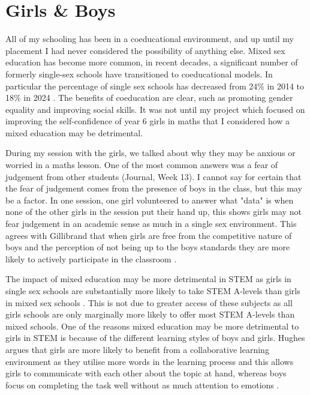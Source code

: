 \documentclass[11pt, a4paper, notitlepage]{article}
\begin{document}
\section*{Girls \& Boys}
All of my schooling has been in a coeducational environment, and up until my placement I had never considered the possibility of anything else. Mixed sex education has become more common, in recent decades, a significant number of formerly single-sex schools have transitioned to coeducational models. In particular the percentage of single sex schools has decreased from 24\% in 2014 to 18\% in 2024 \cite{ICS:2014} \cite{ICS:2024}. The benefits of coeducation are clear, such as promoting gender equality and improving social skills. It was not until my project which focused on improving the self-confidence of year 6 girls in maths that I considered how a mixed education may be detrimental.
\par
During my session with the girls, we talked about why they may be anxious or worried in a maths lesson. One of the most common answers was a fear of judgement from other students (Journal, Week 13). I cannot say for certain that the fear of judgement comes from the presence of boys in the class, but this may be a factor. In one session, one girl volunteered to answer what "data" is when none of the other girls in the session put their hand up, this shows girls may not fear judgement in an academic sense as much in a single sex environment. This agrees with Gillibrand that when girls are free from the competitive nature of boys and the perception of not being up to the boys standards they are more likely to actively participate in the classroom \cite{Gillibrand:1999}.
\par
The impact of mixed education may be more detrimental in STEM as girls in single sex schools are substantially more likely to take STEM A-levels than girls in mixed sex schools \cite{Anders:2022}. This is not due to greater access of these subjects as all girls schools are only marginally more likely to offer most STEM A-levels than mixed schools. One of the reasons mixed education may be more detrimental to girls in STEM is because of the different learning styles of boys and girls. Hughes argues that girls are more likely to benefit from a collaborative learning environment as they utilise more words in the learning process and this allows girls to communicate with each other about the topic at hand, whereas boys focus on completing the task well without as much attention to emotions \cite{Hughes:2006}.
\end{document}
